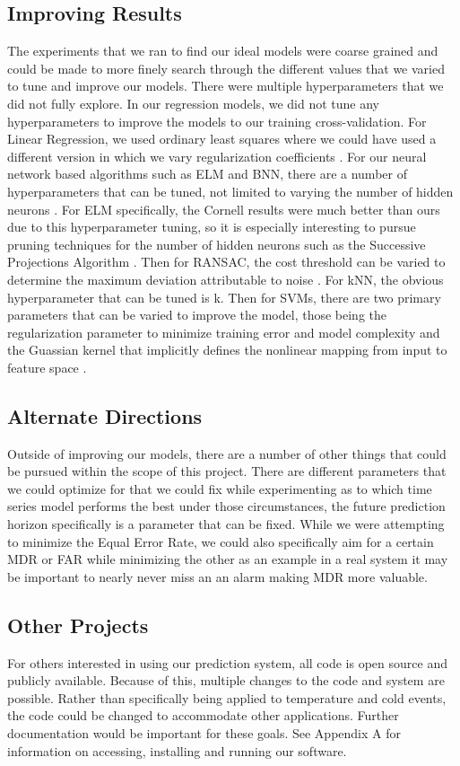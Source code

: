 \documentclass{acm_proc_article-sp}
\begin{document}
\subsection{Improving Results}
The experiments that we ran to find our ideal models were coarse grained and could be made to more finely search through the different values that we varied to tune and improve our models. There were multiple hyperparameters that we did not fully explore. In our regression models, we did not tune any hyperparameters to improve the models to our training cross-validation. For Linear Regression, we used ordinary least squares where we could have used a different version in which we vary regularization coefficients \cite{Cornell}. For our neural network based algorithms such as ELM and BNN, there are a number of hyperparameters that can be tuned, not limited to varying the number of hidden neurons \cite{Cornell}. For ELM specifically, the Cornell results were much better than ours due to this hyperparameter tuning, so it is especially interesting to pursue pruning techniques for the number of hidden neurons such as the Successive Projections Algorithm \cite{ELM}. Then for RANSAC, the cost threshold can be varied to determine the maximum deviation attributable to noise \cite{Cornell}. For kNN, the obvious hyperparameter that can be tuned is k. Then for SVMs, there are two primary parameters that can be varied to improve the model, those being the regularization parameter to minimize training error and model complexity and the Guassian kernel that implicitly defines the nonlinear mapping from input to feature space \cite{Duan03evaluationof}. 

\subsection{Alternate Directions}
Outside of improving our models, there are a number of other things that could be pursued within the scope of this project. There are different parameters that we could optimize for that we could fix while experimenting as to which time series model performs the best under those circumstances, the future prediction horizon specifically is a parameter that can be fixed. While we were attempting to minimize the Equal Error Rate, we could also specifically aim for a certain MDR or FAR while minimizing the other as an example in a real system it may be important to nearly never miss an an alarm making MDR more valuable.

\subsection{Other Projects}
For others interested in using our prediction system, all code is open source and publicly available. Because of this, multiple changes to the code and system are possible. Rather than specifically being applied to temperature and cold events, the code could be changed to accommodate other applications. Further documentation would be important for these goals. See Appendix A for information on accessing, installing and running our software.
\end{document}
